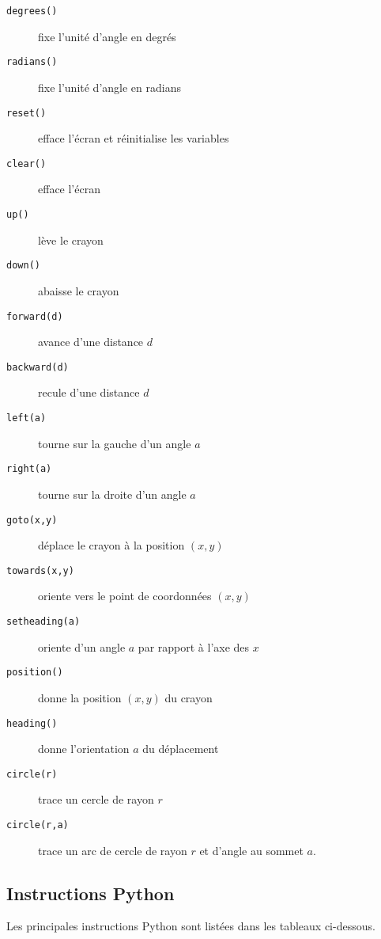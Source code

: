 \mbox{}\hspace*{1cm}
\begin{minipage}{\textwidth}\footnotesize
\begin{description}
\item[\tt degrees()] fixe l'unité d'angle en degrés
\item[\tt radians()] fixe l'unité d'angle en radians
\item[\tt reset()] efface l'écran et réinitialise les variables
\item[\tt clear()] efface l'écran
\item[\tt up()] lève le crayon 
\item[\tt down()] abaisse le crayon 
\item[\tt forward(d)] avance d'une distance $d$
\item[\tt backward(d)] recule d'une distance $d$
\item[\tt left(a)] tourne sur la gauche d'un angle $a$
\item[\tt right(a)] tourne sur la droite d'un angle $a$
\item[\tt goto(x,y)] déplace le crayon à la position $(x,y)$
\item[\tt towards(x,y)] oriente vers le point de coordonnées $(x,y)$
\item[\tt setheading(a)] oriente d'un angle $a$ par rapport à l'axe des $x$
\item[\tt position()] donne la position $(x,y)$ du crayon
\item[\tt heading()] donne l'orientation $a$ du déplacement 
\item[\tt circle(r)] trace un cercle de rayon $r$
\item[\tt circle(r,a)] trace un arc de cercle de rayon $r$ et d'angle au sommet $a$.
\end{description}
\end{minipage}

\subsection{Instructions {\sc Python}}\label{python}
Les principales instructions {\sc Python} sont listées dans les tableaux
ci-dessous.

